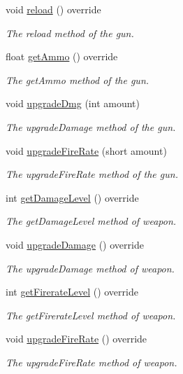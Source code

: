 \begin{DoxyCompactItemize}
void \hyperlink{class_gun_ad92a9c0cc00e8e65bb4f7589c9e58113}{reload} () override
\begin{DoxyCompactList}\small\item\em The reload method of the gun. \end{DoxyCompactList}\item 
float \hyperlink{class_gun_a11bf618e3bf21f3be546c843c64b06f1}{get\+Ammo} () override
\begin{DoxyCompactList}\small\item\em The get\+Ammo method of the gun. \end{DoxyCompactList}\item 
void \hyperlink{class_gun_aa35ec2c6dff5d0d2e5392f98c74e86e5}{upgrade\+Dmg} (int amount)
\begin{DoxyCompactList}\small\item\em The upgrade\+Damage method of the gun. \end{DoxyCompactList}\item 
void \hyperlink{class_gun_a7db78488abab127b3fceefd56c9b2de6}{upgrade\+Fire\+Rate} (short amount)
\begin{DoxyCompactList}\small\item\em The upgrade\+Fire\+Rate method of the gun. \end{DoxyCompactList}\item 
int \hyperlink{class_gun_a390b808f9094e07df029b8938749df28}{get\+Damage\+Level} () override
\begin{DoxyCompactList}\small\item\em The get\+Damage\+Level method of weapon. \end{DoxyCompactList}\item 
void \hyperlink{class_gun_a0d4270857233543d7c326995f746e27a}{upgrade\+Damage} () override
\begin{DoxyCompactList}\small\item\em The upgrade\+Damage method of weapon. \end{DoxyCompactList}\item 
int \hyperlink{class_gun_a9a7483bdcb239a4039ac2100e9794956}{get\+Firerate\+Level} () override
\begin{DoxyCompactList}\small\item\em The get\+Firerate\+Level method of weapon. \end{DoxyCompactList}\item 
void \hyperlink{class_gun_a0a5fa9346fbaa59e60d0f0a16e64ab11}{upgrade\+Fire\+Rate} () override
\begin{DoxyCompactList}\small\item\em The upgrade\+Fire\+Rate method of weapon. \end{DoxyCompactList}\item 

\end{DoxyCompactItemize}
